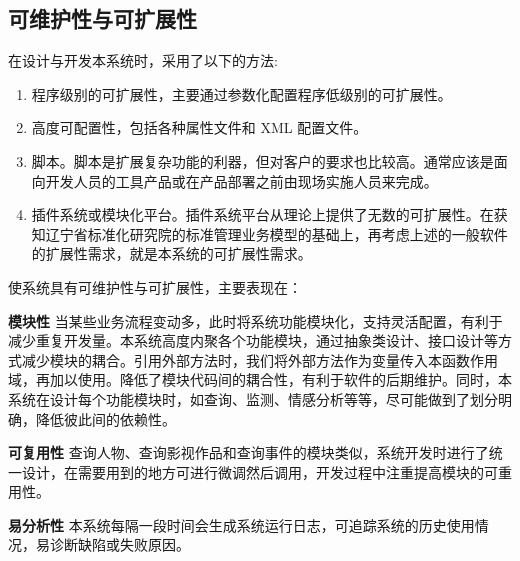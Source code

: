 \subsection{可维护性与可扩展性}
在设计与开发本系统时，采用了以下的方法:

\begin{enumerate}
\item 程序级别的可扩展性，主要通过参数化配置程序低级别的可扩展性。
\item 高度可配置性，包括各种属性文件和 XML 配置文件。
\item 脚本。脚本是扩展复杂功能的利器，但对客户的要求也比较高。通常应该是面向开发人员的工具产品或在产品部署之前由现场实施人员来完成。
\item 插件系统或模块化平台。插件系统平台从理论上提供了无数的可扩展性。在获知辽宁省标准化研究院的标准管理业务模型的基础上，再考虑上述的一般软件的扩展性需求，就是本系统的可扩展性需求。
\end{enumerate}
	
使系统具有可维护性与可扩展性，主要表现在：

\textbf{模块性}
当某些业务流程变动多，此时将系统功能模块化，支持灵活配置，有利于减少重复开发量。本系统高度内聚各个功能模块，通过抽象类设计、接口设计等方式减少模块的耦合。引用外部方法时，我们将外部方法作为变量传入本函数作用域，再加以使用。降低了模块代码间的耦合性，有利于软件的后期维护。同时，本系统在设计每个功能模块时，如查询、监测、情感分析等等，尽可能做到了划分明确，降低彼此间的依赖性。

\textbf{可复用性}
查询人物、查询影视作品和查询事件的模块类似，系统开发时进行了统一设计，在需要用到的地方可进行微调然后调用，开发过程中注重提高模块的可重用性。

\textbf{易分析性}
本系统每隔一段时间会生成系统运行日志，可追踪系统的历史使用情况，易诊断缺陷或失败原因。


